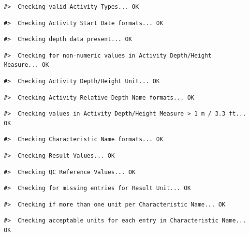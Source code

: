 \begin{verbatim}
#>  Checking valid Activity Types... OK
\end{verbatim}

\begin{verbatim}
#>  Checking Activity Start Date formats... OK
\end{verbatim}

\begin{verbatim}
#>  Checking depth data present... OK
\end{verbatim}

\begin{verbatim}
#>  Checking for non-numeric values in Activity Depth/Height Measure... OK
\end{verbatim}

\begin{verbatim}
#>  Checking Activity Depth/Height Unit... OK
\end{verbatim}

\begin{verbatim}
#>  Checking Activity Relative Depth Name formats... OK
\end{verbatim}

\begin{verbatim}
#>  Checking values in Activity Depth/Height Measure > 1 m / 3.3 ft... OK
\end{verbatim}

\begin{verbatim}
#>  Checking Characteristic Name formats... OK
\end{verbatim}

\begin{verbatim}
#>  Checking Result Values... OK
\end{verbatim}

\begin{verbatim}
#>  Checking QC Reference Values... OK
\end{verbatim}

\begin{verbatim}
#>  Checking for missing entries for Result Unit... OK
\end{verbatim}

\begin{verbatim}
#>  Checking if more than one unit per Characteristic Name... OK
\end{verbatim}

\begin{verbatim}
#>  Checking acceptable units for each entry in Characteristic Name... OK
\end{verbatim}

